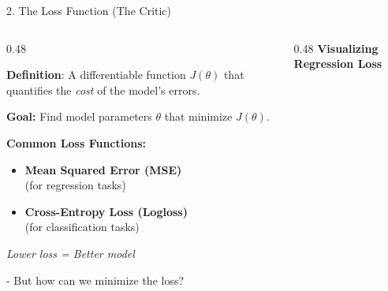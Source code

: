 \begin{frame}{2. The Loss Function (The Critic)}
    \begin{columns}[T]
        \begin{column}{0.48\textwidth}
            \item \textbf{Definition}: A differentiable function $J(\theta)$ that quantifies the \textit{cost} of the model's errors.
            \vspace{0.5em}
            
            \textbf{Goal:} Find model parameters $\theta$ that minimize $J(\theta)$.
            
            \vspace{0.8em}
            \textbf{Common Loss Functions:}
            \begin{itemize}
                \item \textbf{\small Mean Squared Error (MSE)}\\
                (for regression tasks)
                
                \vspace{0.3em}
                \item \textbf{\small Cross-Entropy Loss (Logloss)}\\
                (for classification tasks)
            \end{itemize}
            
            \vspace{0.5em}
            \small\textit{Lower loss = Better model}
            
            \vspace{1em}
            \small{- But how can we minimize the loss?}
        \end{column}
        
        \begin{column}{0.48\textwidth}
            \centering
            \textbf{Visualizing Regression Loss}
            
            \vspace{0.5em}
\end{column}
\end{columns}
\end{frame}
